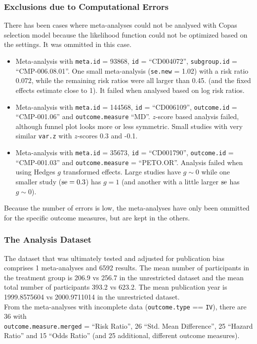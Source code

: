 \documentclass[11pt,a4paper,twoside]{book}\usepackage[]{graphicx}\usepackage[]{color}
\begin{document}
\subsubsection{Exclusions due to Computational Errors}
There has been cases where meta-analyses could not be analysed with Copas selection model because the likelihood function could not be optimized based on the settings. It was ommitted in this case.\\
\begin{itemize}
\item Meta-analysis with \texttt{meta.id} = 93868,  \texttt{id} = ``CD004072'', \texttt{subgroup.id} = ``CMP-006.08.01''. One small meta-analysis (\texttt{se.new} = 1.02) with a risk ratio 0.072, while the remaining risk ratios were all larger than 0.45. (and the fixed effects estimate close to 1). It failed when analysed based on log risk ratios.
\item Meta-analysis with \texttt{meta.id} = 144568,  \texttt{id} = ``CD006109'', \texttt{outcome.id} = ``CMP-001.06'' and \texttt{outcome.measure} ``MD''. $z$-score based analysis failed, although funnel plot looks more or less symmetric. Small studies with very similar \texttt{var.z} with $z$-scores 0.3 and -0.1.
\item Meta-analysis with \texttt{meta.id} = 35673,  \texttt{id} = ``CD001790'', \texttt{outcome.id} = ``CMP-001.03'' and \texttt{outcome.measure} = ``PETO.OR''. Analysis failed when using Hedges $g$ transformed effects. Large studies have $g \sim 0$ while one smaller study ($\operatorname{se} = 0.3$) has $g = 1$ (and another with a little larger $\operatorname{se}$ has $g \sim 0$).
\end{itemize}
Because the number of errors is low, the meta-analyses have only been ommitted for the specific outcome measures, but are kept in the others. 

\subsubsection{The Analysis Dataset}
The dataset that was ultimately tested and adjusted for publication bias comprises 1 meta-analyses and 6592 results. The mean number of participants in the treatment group is 206.9 vs 256.7 in the unrestricted dataset and the mean total number of participants 393.2 vs 623.2. The mean publication year is 1999.8575604 vs 2000.9711014 in the unrestricted dataset. \\
From the meta-analyses with incomplete data (\texttt{outcome.type} == \texttt{IV}), there are 36 with \\ \texttt{outcome.measure.merged} = ``Risk Ratio'', 26 ``Std. Mean Difference'',  25 ``Hazard Ratio'' and 15 ``Odds Ratio'' (and 25 additional, different outcome measures).
\end{document}
